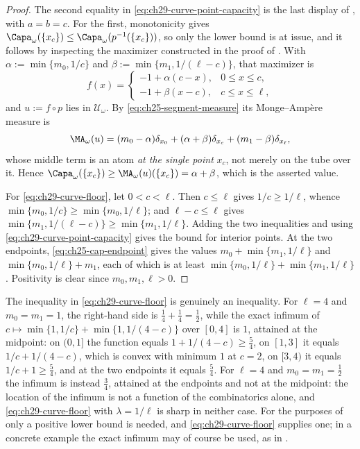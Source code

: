 \begin{proof}
The second equality in \eqref{eq:ch29-curve-point-capacity} is the last
display of , with $a=b=c$.  For the
first, monotonicity gives
$\Capa_\omega(\{x_c\})\leq\Capa_\omega(p^{-1}(\{x_c\}))$, so only the
lower bound is at issue, and it follows by inspecting the maximizer
constructed in the proof of .  With
$\alpha:=\min\{m_0,1/c\}$ and $\beta:=\min\{m_1,1/(\ell-c)\}$, that
maximizer is
\[
 f(x)=\begin{cases}
   -1+\alpha(c-x),&0\leq x\leq c,\\
   -1+\beta(x-c),&c\leq x\leq\ell,
 \end{cases}
\]
and $u:=f\circ p$ lies in $\mathcal U_\omega$.  By
\eqref{eq:ch25-segment-measure} its Monge--Amp\`ere measure is
\[
 \MA_\omega(u)=(m_0-\alpha)\delta_{x_0}
   +(\alpha+\beta)\delta_{x_c}
   +(m_1-\beta)\delta_{x_\ell},
\]
whose middle term is an atom \emph{at the single point} $x_c$, not merely
on the tube over it.  Hence
$\Capa_\omega(\{x_c\})\geq\MA_\omega(u)(\{x_c\})=\alpha+\beta$, which is
the asserted value.

For \eqref{eq:ch29-curve-floor}, let $0<c<\ell$.  Then $c\leq\ell$ gives
$1/c\geq1/\ell$, whence
$\min\{m_0,1/c\}\geq\min\{m_0,1/\ell\}$; and $\ell-c\leq\ell$ gives
$\min\{m_1,1/(\ell-c)\}\geq\min\{m_1,1/\ell\}$.  Adding the two
inequalities and using \eqref{eq:ch29-curve-point-capacity} gives the bound
for interior points.  At the two endpoints,
\eqref{eq:ch25-cap-endpoint} gives the values
$m_0+\min\{m_1,1/\ell\}$ and $\min\{m_0,1/\ell\}+m_1$, each of which is
at least $\min\{m_0,1/\ell\}+\min\{m_1,1/\ell\}$.  Positivity is clear
since $m_0,m_1,\ell>0$.
\end{proof}

\begin{remark}
\label{rem:ch29-floor-not-sharp}
The inequality in \eqref{eq:ch29-curve-floor} is genuinely an inequality.
For $\ell=4$ and $m_0=m_1=1$, the right-hand side is
$\tfrac14+\tfrac14=\tfrac12$, while the exact infimum of
$c\mapsto\min\{1,1/c\}+\min\{1,1/(4-c)\}$ over $[0,4]$ is $1$, attained
at the midpoint: on $(0,1]$ the function equals $1+1/(4-c)\geq\tfrac54$,
on $[1,3]$ it equals $1/c+1/(4-c)$, which is convex with minimum $1$ at
$c=2$, on $[3,4)$ it equals $1/c+1\geq\tfrac54$, and at the two
endpoints it equals $\tfrac54$.  For $\ell=4$ and
$m_0=m_1=\tfrac12$ the infimum is instead $\tfrac34$, attained at the endpoints and not at
the midpoint: the location of the infimum is not a function of the
combinatorics alone, and \eqref{eq:ch29-curve-floor} with
$\lambda=1/\ell$ is sharp in neither case.  For the purposes of
 only a positive lower bound is needed, and
\eqref{eq:ch29-curve-floor} supplies one; in a concrete example the exact
infimum may of course be used, as in
.
\end{remark}

